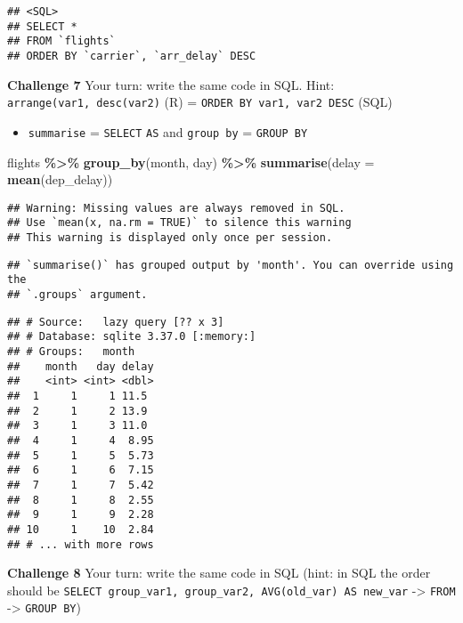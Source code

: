 \documentclass[
]{book}
\newenvironment{Shaded}{\begin{snugshade}}{\end{snugshade}}
\newcommand{\DataTypeTok}[1]{\textcolor[rgb]{0.13,0.29,0.53}{#1}}
\newcommand{\KeywordTok}[1]{\textcolor[rgb]{0.13,0.29,0.53}{\textbf{#1}}}
\newcommand{\NormalTok}[1]{#1}
\newcommand{\OperatorTok}[1]{\textcolor[rgb]{0.81,0.36,0.00}{\textbf{#1}}}
\newcommand{\StringTok}[1]{\textcolor[rgb]{0.31,0.60,0.02}{#1}}
\providecommand{\tightlist}{%
  \setlength{\itemsep}{0pt}\setlength{\parskip}{0pt}}
\begin{document}
\begin{verbatim}
## <SQL>
## SELECT *
## FROM `flights`
## ORDER BY `carrier`, `arr_delay` DESC
\end{verbatim}

\textbf{Challenge 7}
Your turn: write the same code in SQL.
Hint: \texttt{arrange(var1,\ desc(var2)} (R) = \texttt{ORDER\ BY\ var1,\ var2\ DESC} (SQL)

\begin{itemize}
\tightlist
\item
  \texttt{summarise} = \texttt{SELECT} \texttt{AS} and \texttt{group\ by} = \texttt{GROUP\ BY}
\end{itemize}

\begin{Shaded}
\begin{Highlighting}[]
\NormalTok{flights }\OperatorTok{\%\textgreater{}\%}
\StringTok{  }\KeywordTok{group\_by}\NormalTok{(month, day) }\OperatorTok{\%\textgreater{}\%}
\StringTok{  }\KeywordTok{summarise}\NormalTok{(}\DataTypeTok{delay =} \KeywordTok{mean}\NormalTok{(dep\_delay)) }
\end{Highlighting}
\end{Shaded}

\begin{verbatim}
## Warning: Missing values are always removed in SQL.
## Use `mean(x, na.rm = TRUE)` to silence this warning
## This warning is displayed only once per session.
\end{verbatim}

\begin{verbatim}
## `summarise()` has grouped output by 'month'. You can override using the
## `.groups` argument.
\end{verbatim}

\begin{verbatim}
## # Source:   lazy query [?? x 3]
## # Database: sqlite 3.37.0 [:memory:]
## # Groups:   month
##    month   day delay
##    <int> <int> <dbl>
##  1     1     1 11.5 
##  2     1     2 13.9 
##  3     1     3 11.0 
##  4     1     4  8.95
##  5     1     5  5.73
##  6     1     6  7.15
##  7     1     7  5.42
##  8     1     8  2.55
##  9     1     9  2.28
## 10     1    10  2.84
## # ... with more rows
\end{verbatim}

\textbf{Challenge 8}
Your turn: write the same code in SQL (hint: in SQL the order should be \texttt{SELECT\ group\_var1,\ group\_var2,\ AVG(old\_var)\ AS\ new\_var} -\textgreater{} \texttt{FROM} -\textgreater{} \texttt{GROUP\ BY})
\end{document}
